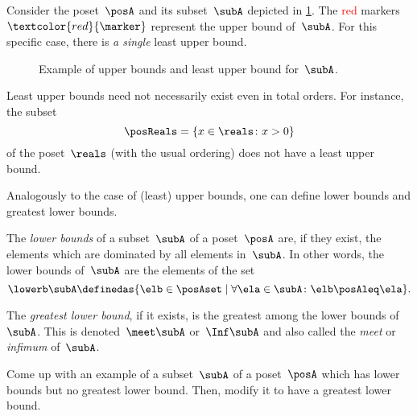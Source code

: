 \begin{example}
    Consider the poset~$\posA$ and its subset~$\subA$ depicted in \cref{fig:upper_bound_example_bis}.
    The \textcolor{red}{red} markers~$\textcolor{red}{\marker}$ represent the upper bound of~$\subA$.
    For this specific case, there is \emph{a single} least upper bound.
\end{example}

\begin{figure}[h!]
    \begin{center}
    \end{center}
    \caption{Example of upper bounds and least upper bound for~$\subA$.  \label{fig:upper_bound_example_bis}}
\end{figure}
\begin{example}
    Least upper bounds need not necessarily exist even in total orders.
    For instance, the subset
    \begin{equation*}
        \posReals = \{x\in \reals \colon x>0\}
    \end{equation*}
    of the poset~$\reals$ (with the usual ordering) does not have a least upper bound.
\end{example}

Analogously to the case of (least) upper bounds, one can define lower bounds and greatest lower bounds.

\begin{ctdefinition}
    \label{def:greatest-lower-bound}
    The \emph{lower bounds} of a subset~$\subA$ of a poset~$\posA$ are, if they exist, the elements which are dominated by all elements in~$\subA$.
    In other words, the lower bounds of~$\subA$ are the elements of the set
    \begin{equation*}
        \lowerb \subA\definedas \{ \elb \in \posAset \mid \forall \ela \in \subA  \colon \elb \posAleq \ela \}.
    \end{equation*}
\end{ctdefinition}

\begin{ctdefinition}
    The \emph{greatest lower bound}, if it exists, is the greatest among the lower bounds of~$\subA$.
    This is denoted~$\meet \subA$ or~$\Inf \subA$ and also called the \emph{meet} or \emph{infimum} of~$\subA$.
\end{ctdefinition}

\begin{exercise}
    Come up with an example of a subset~$\subA$ of a poset~$\posA$ which has lower bounds but no greatest lower bound.
    Then, modify it to have a greatest lower bound.
\end{exercise}

